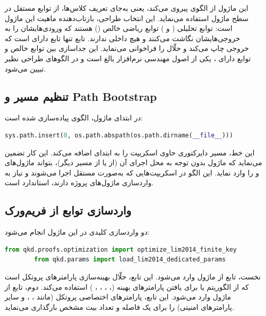 این ماژول از الگوی  پیروی می‌کند، یعنی به‌جای تعریف کلاس‌ها، از توابع مستقل در سطح ماژول استفاده می‌نماید. این انتخاب طراحی، بازتاب‌دهنده ماهیت  این ماژول است: توابع تحلیلی ( و ) توابع ریاضی خالص () هستند که ورودی‌هایشان را به خروجی‌هایشان نگاشت می‌کنند و هیچ  داخلی ندارند. تابع  تنها تابع دارای  است که خروجی چاپ می‌کند و حلّال را فراخوانی می‌نماید. این جداسازی بین توابع خالص و توابع دارای ، یکی از اصول مهندسی نرم‌افزار بالغ است و در الگوهای طراحی نظیر  تبیین می‌شود.

\subsection{تنظیم مسیر و Path Bootstrap}

در ابتدای ماژول، الگوی  پیاده‌سازی شده است:

\begin{LTR}
	\begin{lstlisting}[language=Python]
		sys.path.insert(0, os.path.abspath(os.path.dirname(__file__)))
	\end{lstlisting}
\end{LTR}

این خط، مسیر دایرکتوری حاوی اسکریپت را به ابتدای  اضافه می‌کند. این کار تضمین می‌نماید که ماژول بدون توجه به محل اجرای آن (از  یا از مسیر دیگر)، بتواند ماژول‌های  و  را وارد نماید. این الگو در اسکریپت‌هایی که به‌صورت مستقل اجرا می‌شوند و نیاز به واردسازی ماژول‌های پروژه دارند، استاندارد است.

\subsection{واردسازی توابع از فریم‌ورک}

دو واردسازی کلیدی در این ماژول انجام می‌شود:

\begin{LTR}
	\begin{lstlisting}[language=Python]
		from qkd.proofs.optimization import optimize_lim2014_finite_key
		from qkd.params import load_lim2014_dedicated_params
	\end{lstlisting}
\end{LTR}

نخست، تابع  از ماژول  وارد می‌شود. این تابع، حلّال بهینه‌سازی پارامترهای پروتکل  است که از الگوریتم  یا  برای یافتن پارامترهای بهینه (، ، ، \lr{$\mu$}، \lr{$\nu$}) استفاده می‌کند. دوم، تابع  از ماژول  وارد می‌شود. این تابع، پارامترهای اختصاصی پروتکل  (مانند ، ،  و سایر پارامترهای امنیتی) را برای یک فاصله و تعداد بیت مشخص بارگذاری می‌نماید.


